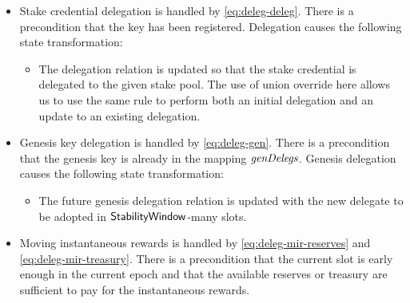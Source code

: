 \begin{itemize}
  \item Stake credential delegation is handled by \cref{eq:deleg-deleg}.
    There is a precondition that the key has been registered.
    Delegation causes the following state transformation:
    \begin{itemize}
    \item The delegation relation is updated so that the stake credential is
      delegated to the given stake pool. The use of union override here allows
      us to use the same rule to perform both an initial delegation and an
      update to an existing delegation.
    \end{itemize}

  \item Genesis key delegation is handled by \cref{eq:deleg-gen}.
    There is a precondition that the genesis key is already in the mapping $\mathit{genDelegs}$.
    Genesis delegation causes the following state transformation:
    \begin{itemize}
      \item The future genesis delegation relation is updated with the new delegate
        to be adopted in $\mathsf{StabilityWindow}$-many slots.
      \end{itemize}

    \item  Moving instantaneous rewards is handled by
      \cref{eq:deleg-mir-reserves} and \cref{eq:deleg-mir-treasury}.
      There is a precondition that the current slot is early enough in the current
      epoch and that the available reserves or treasury are sufficient to pay for the
      instantaneous rewards.
\end{itemize}



